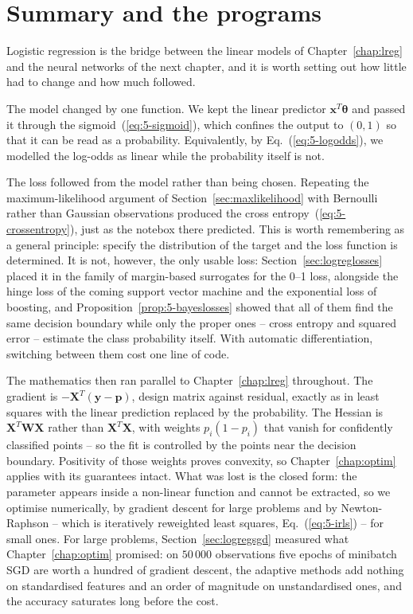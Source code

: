 \section{Summary and the programs}
\label{sec:ch5summary}

Logistic regression is the bridge between the linear models of
Chapter~\ref{chap:lreg} and the neural networks of the next chapter, and it is
worth setting out how little had to change and how much followed.

The model changed by one function.  We kept the linear predictor
$\bm{x}^{T}\bm{\theta}$ and passed it through the sigmoid~(\ref{eq:5-sigmoid}),
which confines the output to $(0,1)$ so that it can be read as a probability.
Equivalently, by Eq.~(\ref{eq:5-logodds}), we modelled the log-odds as linear
while the probability itself is not.

The loss followed from the model rather than being chosen.  Repeating the
maximum-likelihood argument of Section~\ref{sec:maxlikelihood} with Bernoulli
rather than Gaussian observations produced the cross
entropy~(\ref{eq:5-crossentropy}), just as the notebox there predicted.  This
is worth remembering as a general principle: specify the distribution of the
target and the loss function is determined.  It is not, however, the only
usable loss: Section~\ref{sec:logreglosses} placed it in the family of
margin-based surrogates for the 0--1 loss, alongside the hinge loss of the
coming support vector machine and the exponential loss of boosting, and
Proposition~\ref{prop:5-bayeslosses} showed that all of them find the same
decision boundary while only the proper ones -- cross entropy and squared
error -- estimate the class probability itself.  With automatic
differentiation, switching between them cost one line of code.

The mathematics then ran parallel to Chapter~\ref{chap:lreg} throughout.  The
gradient is $-\bm{X}^{T}(\bm{y}-\bm{p})$, design matrix against residual,
exactly as in least squares with the linear prediction replaced by the
probability.  The Hessian is $\bm{X}^{T}\bm{W}\bm{X}$ rather than
$\bm{X}^{T}\bm{X}$, with weights $p_i(1-p_i)$ that vanish for confidently
classified points -- so the fit is controlled by the points near the decision
boundary.  Positivity of those weights proves convexity, so
Chapter~\ref{chap:optim} applies with its guarantees intact.  What was lost is
the closed form: the parameter appears inside a non-linear function and cannot
be extracted, so we optimise numerically, by gradient descent for large
problems and by Newton-Raphson -- which is iteratively reweighted least
squares, Eq.~(\ref{eq:5-irls}) -- for small ones.  For large problems,
Section~\ref{sec:logregsgd} measured what Chapter~\ref{chap:optim} promised:
on $50\,000$ observations five epochs of minibatch SGD are worth a hundred of
gradient descent, the adaptive methods add nothing on standardised features
and an order of magnitude on unstandardised ones, and the accuracy
saturates long before the cost.

